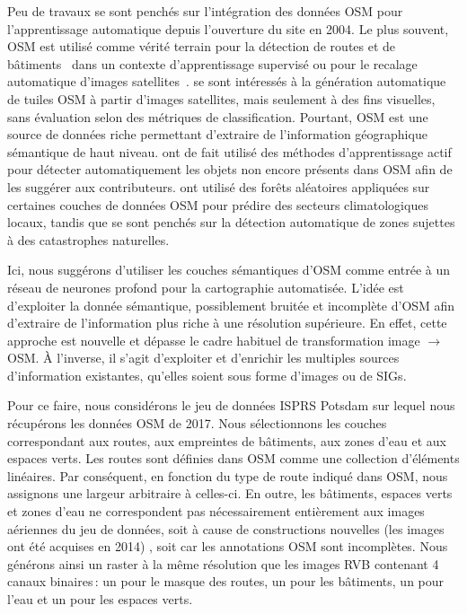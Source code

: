 Peu de travaux se sont penchés sur l'intégration des données \gls{OSM} pour l'apprentissage automatique depuis l'ouverture du site en 2004. Le plus souvent, \gls{OSM} est utilisé comme vérité terrain pour la détection de routes et de bâtiments~\cite{mnih_machine_2013,maggiori_learning_2017} dans un contexte d'apprentissage supervisé ou pour le recalage automatique d'images satellites~\cite{vakalopoulou_simultaneous_2016}. \citet{isola_image--image_2016} se sont intéressés à la génération automatique de tuiles \gls{OSM} à partir d'images satellites, mais seulement à des fins visuelles, sans évaluation selon des métriques de classification. Pourtant, \gls{OSM} est une source de données riche permettant d'extraire de l'information géographique sémantique de haut niveau.
\citet{chen_deepvgi_2017} ont de fait utilisé des méthodes d'apprentissage actif pour détecter automatiquement les objets non encore présents dans \gls{OSM} afin de les suggérer aux contributeurs. \citet{danylo_contributing_2016} ont utilisé des forêts aléatoires appliquées sur certaines couches de données \gls{OSM} pour prédire des secteurs climatologiques locaux, tandis que \citet{geis_joint_2017} se sont penchés sur la détection automatique de zones sujettes à des catastrophes naturelles.

Ici, nous suggérons d'utiliser les couches sémantiques d'\gls{OSM} comme entrée à un réseau de neurones profond pour la cartographie automatisée. L'idée est d'exploiter la donnée sémantique, possiblement bruitée et incomplète d'\gls{OSM} afin d'extraire de l'information plus riche à une résolution supérieure. En effet, cette approche est nouvelle et dépasse le cadre habituel de transformation image $\rightarrow$ \gls{OSM}. À l'inverse, il s'agit d'exploiter et d'enrichir les multiples sources d'information existantes, qu'elles soient sous forme d'images ou de \glspl{SIG}.

Pour ce faire, nous considérons le jeu de données \gls{ISPRS} Potsdam sur lequel nous récupérons les données \gls{OSM} de 2017. Nous sélectionnons les couches correspondant aux routes, aux empreintes de bâtiments, aux zones d'eau et aux espaces verts. Les routes sont définies dans \gls{OSM} comme une collection d'éléments linéaires. Par conséquent, en fonction du type de route indiqué dans \gls{OSM}, nous assignons une largeur arbitraire à celles-ci. En outre, les bâtiments, espaces verts et zones d'eau ne correspondent pas nécessairement entièrement aux images aériennes du jeu de données, soit à cause de constructions nouvelles (les images ont été acquises en 2014) , soit car les annotations \gls{OSM} sont incomplètes. Nous générons ainsi un raster à la même résolution que les images \gls{RVB} contenant 4 canaux binaires\,: un pour le masque des routes, un pour les bâtiments, un pour l'eau et un pour les espaces verts.


